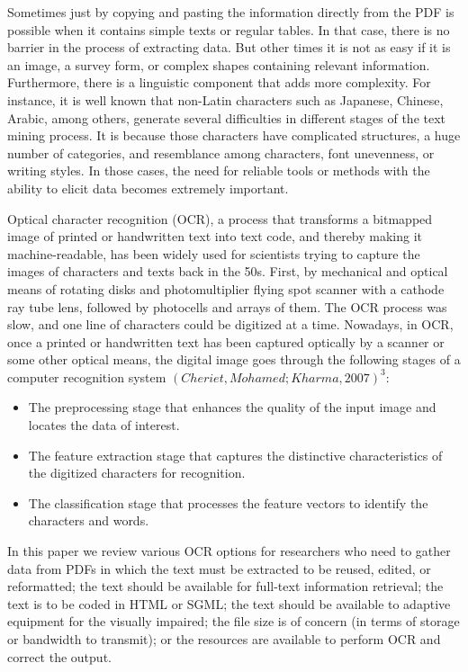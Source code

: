 \documentclass[
]{article}
\providecommand{\tightlist}{%
  \setlength{\itemsep}{0pt}\setlength{\parskip}{0pt}}
\begin{document}
Sometimes just by copying and pasting the information directly from the
PDF is possible when it contains simple texts or regular tables. In that
case, there is no barrier in the process of extracting data. But other
times it is not as easy if it is an image, a survey form, or complex
shapes containing relevant information. Furthermore, there is a
linguistic component that adds more complexity. For instance, it is well
known that non-Latin characters such as Japanese, Chinese, Arabic, among
others, generate several difficulties in different stages of the text
mining process. It is because those characters have complicated
structures, a huge number of categories, and resemblance among
characters, font unevenness, or writing styles. In those cases, the need
for reliable tools or methods with the ability to elicit data becomes
extremely important.

Optical character recognition (OCR), a process that transforms a
bitmapped image of printed or handwritten text into text code, and
thereby making it machine-readable, has been widely used for scientists
trying to capture the images of characters and texts back in the 50s.
First, by mechanical and optical means of rotating disks and
photomultiplier flying spot scanner with a cathode ray tube lens,
followed by photocells and arrays of them. The OCR process was slow, and
one line of characters could be digitized at a time. Nowadays, in OCR,
once a printed or handwritten text has been captured optically by a
scanner or some other optical means, the digital image goes through the
following stages of a computer recognition system
\((Cheriet, Mohamed; Kharma, 2007)^3\):

\begin{itemize}
\tightlist
\item
  The preprocessing stage that enhances the quality of the input image
  and locates the data of interest.
\item
  The feature extraction stage that captures the distinctive
  characteristics of the digitized characters for recognition.
\item
  The classification stage that processes the feature vectors to
  identify the characters and words.
\end{itemize}

In this paper we review various OCR options for researchers who need to
gather data from PDFs in which the text must be extracted to be reused,
edited, or reformatted; the text should be available for full-text
information retrieval; the text is to be coded in HTML or SGML; the text
should be available to adaptive equipment for the visually impaired; the
file size is of concern (in terms of storage or bandwidth to transmit);
or the resources are available to perform OCR and correct the output.
\end{document}
